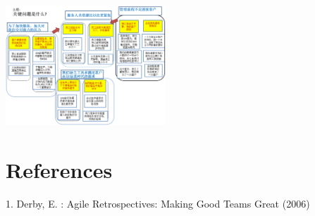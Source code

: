 \begin{description}
\item[]
\end{description}


\includegraphics[width=6cm]{KJ_10.png}

\hypertarget{references}{%
\section{References}\label{references}}

1. Derby, E. : Agile Retrospectives: Making Good Teams Great (2006)





